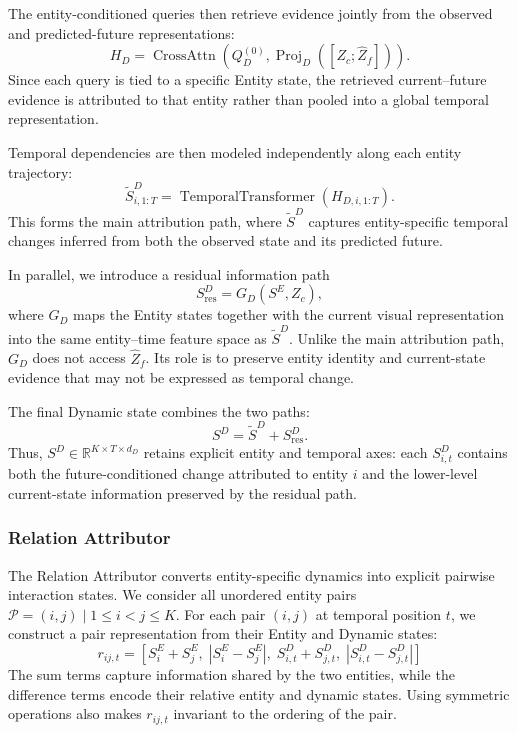 \documentclass{article}
\begin{document}
The entity-conditioned queries then retrieve evidence jointly from the observed and predicted-future representations:
\begin{equation}
H_D
=
\operatorname{CrossAttn}
\left(
Q_D^{(0)},
\operatorname{Proj}_D
\left([Z_c;\widehat Z_f]\right)
\right).
\label{eq:app-dynamic-attn}
\end{equation}
Since each query is tied to a specific Entity state, the retrieved current--future evidence is attributed to that entity rather than pooled into a global temporal representation.

Temporal dependencies are then modeled independently along each entity trajectory:
\begin{equation}
\widetilde S^D_{i,1:T}
=
\operatorname{TemporalTransformer}
\left(
H_{D,i,1:T}
\right).
\label{eq:app-dynamic-temporal}
\end{equation}
This forms the main attribution path, where $\widetilde S^D$ captures entity-specific temporal changes inferred from both the observed state and its predicted future.

In parallel, we introduce a residual information path
\begin{equation}
S^D_{\mathrm{res}}
=
G_D(S^E,Z_c),
\label{eq:app-dynamic-residual}
\end{equation}
where $G_D$ maps the Entity states together with the current visual representation into the same entity--time feature space as $\widetilde S^D$. Unlike the main attribution path, $G_D$ does not access $\widehat Z_f$. Its role is to preserve entity identity and current-state evidence that may not be expressed as temporal change.

The final Dynamic state combines the two paths:
\begin{equation}
S^D
=
\widetilde S^D
+
S^D_{\mathrm{res}}.
\label{eq:app-dynamic}
\end{equation}
Thus, $S^D\in\mathbb{R}^{K\times T\times d_D}$ retains explicit entity and temporal axes: each $S^D_{i,t}$ contains both the future-conditioned change attributed to entity $i$ and the lower-level current-state information preserved by the residual path.


\subsubsection{Relation Attributor}

The Relation Attributor converts entity-specific dynamics into explicit pairwise interaction states. We consider all unordered entity pairs
$\mathcal{P}={(i,j)\mid 1\leq i<j\leq K}$.
For each pair $(i,j)$ at temporal position $t$, we construct a pair representation from their Entity and Dynamic states:
\begin{equation}
r_{ij,t}
=
\left[
S_i^E + S_j^E,\;
|S_i^E-S_j^E|,\;
S_{i,t}^D + S_{j,t}^D,\;
|S_{i,t}^D-S_{j,t}^D|
\right]
\label{eq:app-relation-input}
\end{equation}
The sum terms capture information shared by the two entities, while the difference terms encode their relative entity and dynamic states. Using symmetric operations also makes $r_{ij,t}$ invariant to the ordering of the pair.
\end{document}
